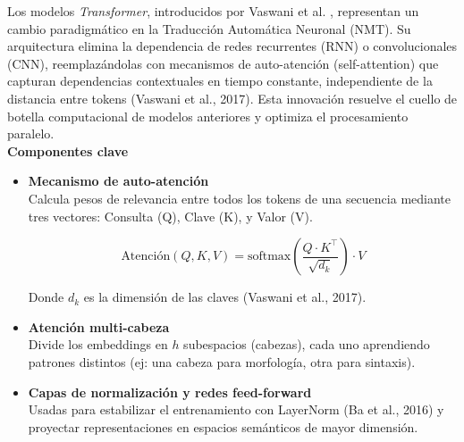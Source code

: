         Los modelos \textit{Transformer}, introducidos por Vaswani et al. \cite{vaswani2017attention}, representan un cambio paradigmático en la Traducción Automática Neuronal (NMT). Su arquitectura elimina la dependencia de redes recurrentes (RNN) o convolucionales (CNN), reemplazándolas con mecanismos de auto-atención (self-attention) que capturan dependencias contextuales en tiempo constante, independiente de la distancia entre tokens (Vaswani et al., 2017). Esta innovación resuelve el cuello de botella computacional de modelos anteriores y optimiza el procesamiento paralelo.
        \\ 
        \textbf{Componentes clave}
        \begin{itemize}
            \item \textbf{Mecanismo de auto-atención}\\
            Calcula pesos de relevancia entre todos los tokens de una secuencia mediante tres vectores: Consulta (Q), Clave (K), y Valor (V).
            
            \begin{equation}
                \text{Atención}(Q, K, V) = \text{softmax}\left( \frac{Q \cdot K^\top}{\sqrt{d_k}} \right) \cdot V
            \end{equation}
            
            Donde $d_k$ es la dimensión de las claves (Vaswani et al., 2017).            
            
            \item \textbf{Atención multi-cabeza}\\
            Divide los embeddings en $h$ subespacios (cabezas), cada uno aprendiendo patrones distintos (ej: una cabeza para morfología, otra para sintaxis). 
            
            \item \textbf{Capas de normalización y redes feed-forward}\\
            Usadas para estabilizar el entrenamiento con LayerNorm (Ba et al., 2016) y proyectar representaciones en espacios semánticos de mayor dimensión.
        \end{itemize}

